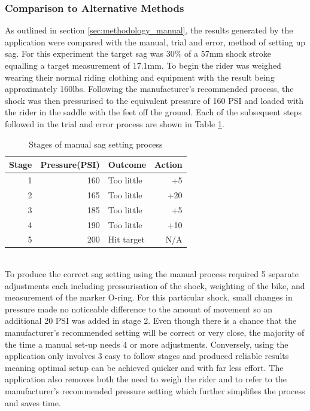 		\subsubsection{Comparison to Alternative Methods}\label{sec:alt_methods}
			As outlined in section \ref{sec:methodology_manual}, the results generated by the application were compared with the manual, trial and error, method of setting up sag. For this experiment the target sag was 30\% of a 57mm shock stroke equalling a target measurement of 17.1mm. To begin the rider was weighed wearing their normal riding clothing and equipment with the result being approximately 160lbs. Following the manufacturer’s recommended process, the shock was then pressurised to the equivalent pressure of 160 PSI and loaded with the rider in the saddle with the feet off the ground. Each of the subsequent steps followed in the trial and error process are shown in Table \ref{tab:manual_process}.
			\begin{table}[h!]
				\centering
				\caption{Stages of manual sag setting process}
				\label{tab:manual_process}
				\begin{tabular}{|r|r|l|r|}
					\hline
					\bfseries Stage&\bfseries Pressure(PSI)&\bfseries Outcome&\bfseries Action\\
					\hline
					1&160&Too little&+5\\
					2&165&Too little&+20\\
					3&185&Too little&+5\\
					4&190&Too little&+10\\
					5&200&Hit target&N/A\\
					\hline
				\end{tabular}
			\end{table}\\
			To produce the correct sag setting using the manual process required 5 separate adjustments each including pressurisation of the shock, weighting of the bike, and measurement of the marker O-ring. For this particular shock, small changes in pressure made no noticeable difference to the amount of movement so an additional 20 PSI was added in stage 2. Even though there is a chance that the manufacturer’s recommended setting will be correct or very close, the majority of the time a manual set-up needs 4 or more adjustments. Conversely, using the application only involves 3 easy to follow stages and produced reliable results meaning optimal setup can be achieved quicker and with far less effort. The application also removes both the need to weigh the rider and to refer to the manufacturer’s recommended pressure setting which further simplifies the process and saves time. 
